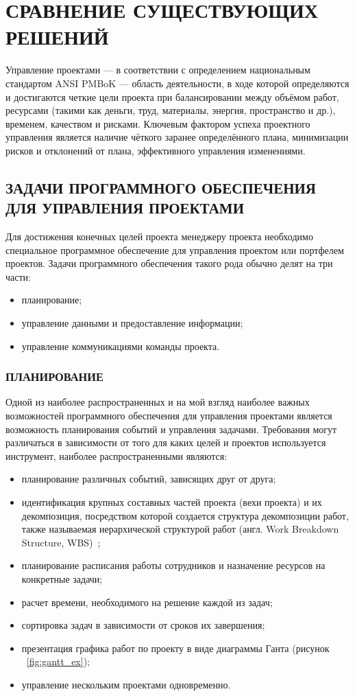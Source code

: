 \documentclass[14pt, a4paper]{extreport}
\begin{document}
\chapter{\MakeTextUppercase{Сравнение существующих решений}}
Управление проектами --- в соответствии с определением национальным стандартом
ANSI PMBoK — область деятельности, в ходе которой определяются и достигаются
четкие цели проекта при балансировании между объёмом работ, ресурсами 
(такими как деньги, труд, материалы, энергия, пространство и др.), временем, качеством и рисками. 
Ключевым фактором успеха проектного управления является наличие чёткого заранее определённого плана,
минимизации рисков и отклонений от плана, эффективного управления изменениями.~\cite{wiki_pm}

\section{\MakeTextUppercase{Задачи программного обеспечения для управления проектами}}
Для достижения конечных целей проекта менеджеру проекта необходимо специальное программное обеспечение
для управления проектом или портфелем проектов.
Задачи программного обеспечения такого рода обычно делят на три части:
\begin{itemize}
\item планирование;
\item управление данными и предоставление информации;
\item управление коммуникациями команды проекта.
\end{itemize}

\subsection{\MakeTextUppercase{Планирование}}
Одной из наиболее распространенных и на мой взгляд наиболее важных возможностей
программного обеспечения для управления проектами является возможность планирования
событий и управления задачами. Требования могут различаться в зависимости от того
для каких целей и проектов используется инструмент, наиболее распространенными являются:
\begin{itemize}
\item планирование различных событий, зависящих друг от друга;
\item идентификация крупных составных частей проекта (вехи проекта) и их декомпозиция, посредством которой создается структура декомпозиции работ, также называемая иерархической структурой работ (англ. Work Breakdown Structure, WBS)~\cite{pmbok};
\item планирование расписания работы сотрудников и назначение ресурсов на конкретные задачи;
\item расчет времени, необходимого на решение каждой из задач;
\item сортировка задач в зависимости от сроков их завершения;
\item презентация графика работ по проекту в виде диаграммы Ганта (рисунок ~\ref{fig:gantt_ex});
\item управление нескольким проектами одновременно.
\end{itemize}
\end{document}
